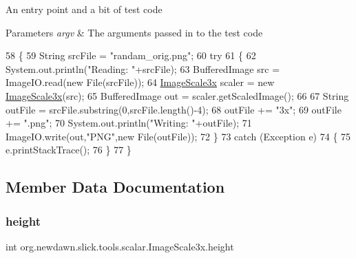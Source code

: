 An entry point and a bit of test code


\begin{DoxyParams}{Parameters}
{\em argv} & The arguments passed in to the test code \\
\hline
\end{DoxyParams}

\begin{DoxyCode}
58     \{
59         String srcFile = \textcolor{stringliteral}{"randam\_orig.png"};
60         \textcolor{keywordflow}{try}
61         \{
62             System.out.println(\textcolor{stringliteral}{"Reading: "}+srcFile);
63             BufferedImage src = ImageIO.read(\textcolor{keyword}{new} File(srcFile));
64             \mbox{\hyperlink{classorg_1_1newdawn_1_1slick_1_1tools_1_1scalar_1_1_image_scale3x_ae271f29b00010fb6c4f20ba00ca58461}{ImageScale3x}} scaler = \textcolor{keyword}{new} \mbox{\hyperlink{classorg_1_1newdawn_1_1slick_1_1tools_1_1scalar_1_1_image_scale3x_ae271f29b00010fb6c4f20ba00ca58461}{ImageScale3x}}(src);
65             BufferedImage out = scaler.getScaledImage();
66 
67             String outFile = srcFile.substring(0,srcFile.length()-4);
68             outFile += \textcolor{stringliteral}{"3x"};
69             outFile += \textcolor{stringliteral}{".png"};
70             System.out.println(\textcolor{stringliteral}{"Writing: "}+outFile);
71             ImageIO.write(out,\textcolor{stringliteral}{"PNG"},\textcolor{keyword}{new} File(outFile));
72         \} 
73         \textcolor{keywordflow}{catch} (Exception e)
74         \{
75             e.printStackTrace();
76         \}
77     \}
\end{DoxyCode}


\subsection{Member Data Documentation}
\mbox{\label{classorg_1_1newdawn_1_1slick_1_1tools_1_1scalar_1_1_image_scale3x_ac2833ff5d8ce6679fed6cbe64efdb5d8}} 
\subsubsection{\texorpdfstring{height}{height}}
{\footnotesize\ttfamily int org.\+newdawn.\+slick.\+tools.\+scalar.\+Image\+Scale3x.\+height\hspace{0.3cm}{\ttfamily [private]}}

